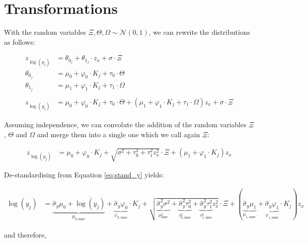 \documentclass[11pt,a4paper]{article}
\begin{document}
\linenumbers
\section*{Transformations}
With the random variables $\Xi, \Theta, \Omega \sim \mathcal{N}(0, 1)$, we can rewrite the distributions as follows:
\begin{linenomath}
\begin{align*}
z_{\log(y_j)} &= \theta_{0_j} + \theta_{1_j} \cdot z_x + \sigma \cdot \Xi \\
\theta_{0_j} &= \mu_0 + \varphi_0 \cdot K_{j} + \tau_0 \cdot \Theta \\
\theta_{1_j} &= \mu_1 + \varphi_1 \cdot K_{j} + \tau_1 \cdot \Omega \\
\\
z_{\log(y_j)} &= \mu_0 + \varphi_0 \cdot K_{j} + \tau_0 \cdot \Theta +
                 (\mu_1 + \varphi_1 \cdot K_{j} + \tau_1 \cdot \Omega) z_x +
                 \sigma \cdot \Xi
\end{align*}
\end{linenomath}
Assuming independence, we can convolute the addition of the random variables $\Xi$, $\Theta$ and $\Omega$ and merge them into a single one which we call again $\Xi$:
\begin{linenomath}
\begin{align*}
z_{\log(y_j)} &= \mu_0 + \varphi_0 \cdot K_{j} + \sqrt{\sigma^2 + \tau_0^2 + \tau_1^2 z_x^2} \cdot \Xi + (\mu_1 + \varphi_1 \cdot K_{j}) z_x 
\end{align*}
\end{linenomath}
De-standardising from Equation \ref{eq:stand_y} yields:
\begin{linenomath}
\begin{align*}
\log(y_j) &= 
	\underbrace{\hat{\sigma}_y \mu_0 + \overline{\log(y_j)}}_{\mu_{0,\text{unsc}}} +
	\underbrace{\hat{\sigma}_y \varphi_0}_{\varphi_{0,{\text{unsc}}}} \cdot K_{j} + 
	\sqrt{\underbrace{\hat{\sigma}_y^2 \sigma^2}_{\sigma^2_\text{unsc}} +
		  \underbrace{\hat{\sigma}_y^2 \tau_0^2}_{\tau_{0,\text{unsc}}^2} + 
  		  \underbrace{\hat{\sigma}_y^2 \tau_1^2}_{\tau_{1,\text{unsc}}^2} z_x^2} \cdot \Xi
	+ (\underbrace{\hat{\sigma}_y \mu_1}_{\mu_{1,\text{unsc}}}
	  + \underbrace{\hat{\sigma}_y \varphi_1}_{\varphi_{1,{\text{unsc}}}} \cdot K_{j}) z_x 
\end{align*}
\end{linenomath}
and therefore,
\end{document}
